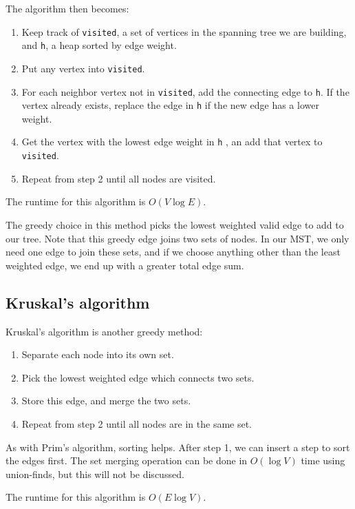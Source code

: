 \documentclass{article}
\begin{document}
The algorithm then becomes:
\begin{enumerate}
\item Keep track of \texttt{visited}, a set of vertices in the spanning tree we are building, and \texttt{h}, a heap sorted by edge weight.
\item Put any vertex into \texttt{visited}.
\item For each neighbor vertex not in \texttt{visited}, add the connecting edge to \texttt{h}.  If the vertex already exists, replace the edge in \texttt{h} if the new edge has a lower weight.
\item Get the vertex with the lowest edge weight in \texttt{h} , an add that vertex to \texttt{visited}.
\item Repeat from step 2 until all nodes are visited.
\end{enumerate}

The runtime for this algorithm is $O(V\log E)$.

The greedy choice in this method picks the lowest weighted valid edge to add to our tree.  Note that this greedy edge joins two sets of nodes.  In our MST, we only need one edge to join these sets, and if we choose anything other than the least weighted edge, we end up with a greater total edge sum.

\subsection{Kruskal's algorithm}
Kruskal's algorithm is another greedy method:
\begin{enumerate}
\item Separate each node into its own set.
\item Pick the lowest weighted edge which connects two sets.
\item Store this edge, and merge the two sets.
\item Repeat from step 2 until all nodes are in the same set.
\end{enumerate}

As with Prim's algorithm, sorting helps.  After step 1, we can insert a step to sort the edges first.  The set merging operation can be done in $O(\log V)$ time using union-finds, but this will not be discussed.

The runtime for this algorithm is $O(E\log V)$.
\end{document}
